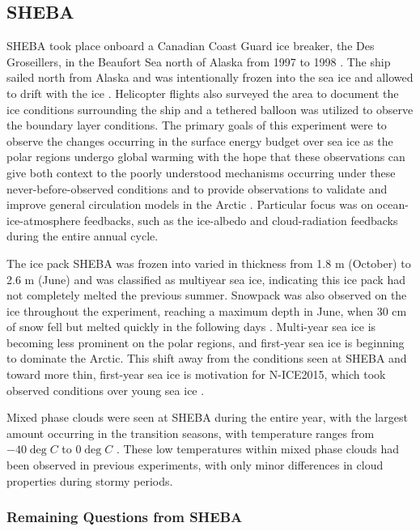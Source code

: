\subsection{SHEBA}

SHEBA took place onboard a Canadian Coast Guard ice breaker, the Des Groseillers, in the Beaufort Sea north of Alaska from 1997 to 1998 \cite{uttal:2002, shupe:2004}. The ship sailed north from Alaska and was intentionally frozen into the sea ice and allowed to drift with the ice \cite{uttal:2002}. Helicopter flights also surveyed the area to document the ice conditions surrounding the ship and a tethered balloon was utilized to observe the boundary layer conditions. The primary goals of this experiment were to observe the changes occurring in the surface energy budget over sea ice as the polar regions undergo global warming with the hope that these observations can give both context to the poorly understood mechanisms occurring under these never-before-observed conditions and to provide observations to validate and improve general circulation models in the Arctic \cite{uttal:2002}. Particular focus was on ocean-ice-atmosphere feedbacks, such as the ice-albedo and cloud-radiation feedbacks during the entire annual cycle. 

The ice pack SHEBA was frozen into varied in thickness from 1.8 m (October) to 2.6 m (June) and was classified as multiyear sea ice, indicating this ice pack had not completely melted the previous summer. Snowpack was also observed on the ice throughout the experiment, reaching a maximum depth in June, when 30 cm of snow fell but melted quickly in the following days \cite{uttal:2002}. Multi-year sea ice is becoming less prominent on the polar regions, and first-year sea ice is beginning to dominate the Arctic. This shift away from the conditions seen at SHEBA and toward more thin, first-year sea ice is motivation for N-ICE2015, which took observed conditions over young sea ice \cite{graham:2017}. 

Mixed phase clouds were seen at SHEBA during the entire year, with the largest amount occurring in the transition seasons, with temperature ranges from $-40 \deg C$ to $0 \deg C$ \cite{shupe:2004}. These low temperatures within mixed phase clouds had been observed in previous experiments, with only minor differences in cloud properties during stormy periods. 

\subsubsection{Remaining Questions from SHEBA}

